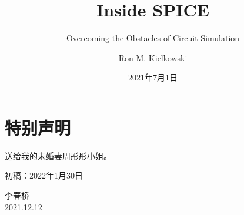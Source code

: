 \documentclass[cn,11pt,chinese]{elegantbook}
\title{Inside SPICE}
\subtitle{Overcoming the Obstacles of Circuit Simulation}
\author{Ron M. Kielkowski}
\date{2021年7月1日}
\begin{document}
\maketitle
\frontmatter

\chapter*{特别声明}

送给我的未婚妻周彤彤小姐。

初稿：2022年1月30日

\vskip 1.5cm

\begin{flushright}
李春桥\\
2021.12.12
\end{flushright}

\tableofcontents

\mainmatter











\nocite{*} 

\appendix




\end{document}
